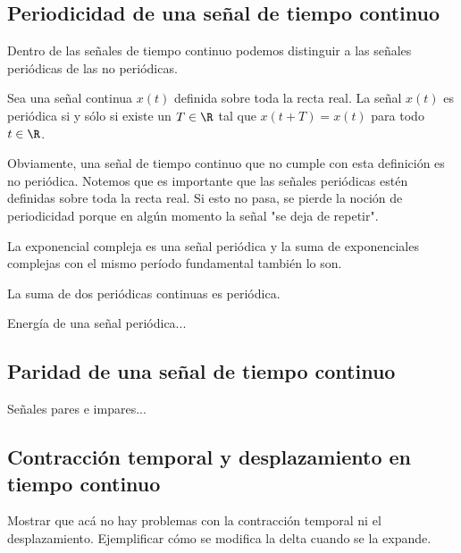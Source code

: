 \subsection{Periodicidad de una señal de tiempo continuo}

Dentro de las señales de tiempo continuo podemos distinguir a las señales periódicas de las no periódicas.

\begin{definition}
    \label{def:ct_periodic_signal}
    Sea una señal continua $x(t)$ definida sobre toda la recta real. La señal $x(t)$ es periódica si y sólo si existe un $T \in \R$ tal que $x(t + T) = x(t)$ para todo $t \in \R$.
\end{definition}

Obviamente, una señal de tiempo continuo que no cumple con esta definición es no periódica. Notemos que es importante que las señales periódicas estén definidas sobre toda la recta real. Si esto no pasa, se pierde la noción de periodicidad porque en algún momento la señal "se deja de repetir". 

\begin{example}
    La exponencial compleja es una señal periódica y la suma de exponenciales complejas con el mismo período fundamental también lo son.
\end{example}

\begin{example}
    La suma de dos periódicas continuas es periódica.
\end{example}

\begin{example}
    
\end{example}

Energía de una señal periódica...

\subsection{Paridad de una señal de tiempo continuo}

Señales pares e impares...

\subsection{Contracción temporal y desplazamiento en tiempo continuo}

Mostrar que acá no hay problemas con la contracción temporal ni el desplazamiento. Ejemplificar cómo se modifica la delta cuando se la expande.

